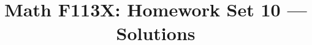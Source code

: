 \newcommand{\sectionhead}[1]{%
  \vspace{2.2em}
  \begin{center}
  \colorbox{black!10}{\parbox{0.92\textwidth}{\centering\vspace{1mm}
  {\large\bfseries #1}\vspace{1mm}}}
  \end{center}
  \vspace{0.3em}
}
\newcommand{\ac}[2]{\par\noindent\textbf{Answer:}~#1%
  {\unskip\nobreak\hfil\penalty50\hskip2em\hbox{}\nobreak\hfill
  \mbox{\small\textcolor{black!70}{cell contents:}~\texttt{#2}}%
  \parfillskip=0pt\finalhyphendemerits=0\par}}
\newcommand{\acn}[1]{\par\noindent\textbf{Answer:}~#1\par}
\newcommand{\typeit}[2]{\par\noindent Type into a spreadsheet:~\texttt{=#1}%
  {\unskip\nobreak\hfil\penalty50\hskip2em\hbox{}\nobreak\hfill
  \mbox{\small\textcolor{black!70}{#2}}%
  \parfillskip=0pt\finalhyphendemerits=0\par}}
\newcommand{\typecells}[1]{\par\noindent{\setlength{\tabcolsep}{6pt}\begin{tabular}[t]{@{\hspace{1.5em}}l@{\hspace{1.2em}}l@{}}\multicolumn{2}{@{}l}{Type into a spreadsheet:}\\[2pt]#1\end{tabular}}\par}
\newcommand{\cellnote}{\noindent\textit{The entries under ``cell contents'' are
  included so that you can see what was typed into the cell. Don't forget that
  you would need to add in ``=''.}\par}

\title{Math F113X: Homework Set 10 --- Solutions}
\author{}
\date{}


\maketitle
\vspace{-2em}

\begin{center}
\end{center}



